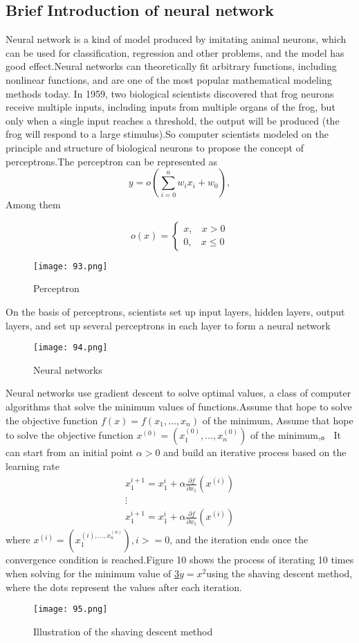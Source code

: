 \documentclass[12pt]{apmcmthesis}
\begin{document}
\subsection{Brief Introduction of neural network}
Neural network is a kind of model produced by imitating animal neurons, which can be used for classification, regression and other problems, and the model has good effect.Neural networks can theoretically fit arbitrary functions, including nonlinear functions, and are one of the most popular mathematical modeling methods today.
In 1959, two biological scientists discovered that frog neurons receive multiple inputs, including inputs from multiple organs of the frog, but only when a single input reaches a threshold, the output will be produced (the frog will respond to a large stimulus).So computer scientists modeled on the principle and structure of biological neurons to propose the concept of perceptrons.The perceptron can be represented as
$$y=o(\sum_{i=0}^{n} w_{i} x_{i}+w_0),$$Among them

$$	o(x)=\left\{\begin{array}{c}
x ,~~~~x>0 \\
0, ~~~~x \leq 0
\end{array}\right.
$$
\begin{figure}[h]
	\centering
	\texttt{[image: 93.png]}
	\caption{Perceptron}
	\label{93}
\end{figure}
On the basis of perceptrons, scientists set up input layers, hidden layers, output layers, and set up several perceptrons in each layer to form a neural network
\begin{figure}[h]
	\centering
	\texttt{[image: 94.png]}
	\caption{Neural networks}
	\label{94}
\end{figure}
Neural networks use gradient descent to solve optimal values, a class of computer algorithms that solve the minimum values of functions.Assume that hope to solve the objective function 
$ f(x)=f(x_1,\dots ,x_n) $ of the minimum, Assume that hope to solve the objective function  $ x^{(0)}=(x_1^{(0)},\dots ,x_n^{(0)}) $ of the minimum,。 It can start from an initial point  $\alpha > 0$ and build an iterative process based on the learning rate \begin{gather*}
x_1^{i+1}=x_1^{i}+\alpha \frac{\partial f}{\partial x_1}(x^{(i)})\\
\vdots \\
x_1^{i+1}=x_1^{i}+\alpha \frac{\partial f}{\partial x_1}(x^{(i)})
\end{gather*}	 where $x^{(i)}=(x_1^{(i),\dots,x_n^{(n)}}),i>=0$, and the iteration ends once the convergence condition is reached.Figure 10 shows the process of iterating 10 times when solving for the minimum value of \ref{95}$y=x^2$using the shaving descent method, where the dots represent the values after each iteration.
\begin{figure}[h]
	\centering
	\texttt{[image: 95.png]}
	\caption{Illustration of the shaving descent method}
	\label{95}
\end{figure}
\end{document}
